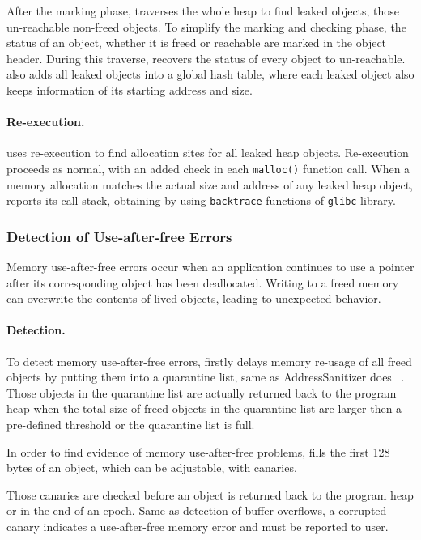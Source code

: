 After the marking phase, \doubletake{} traverses the whole heap to find leaked objects, those un-reachable non-freed objects. To simplify the marking and checking phase, the status of an object, whether it is freed or reachable are marked in the object header. During this traverse, \doubletake{} recovers the status of every object to un-reachable. \doubletake{} also adds all leaked objects into a global hash table, where each leaked object also keeps information of its starting address and size. 

\paragraph{Re-execution.}
\label{sec:leakreport}
\doubletake{} uses re-execution to find allocation sites for all leaked heap objects. Re-execution proceeds as normal, with an added check in each \texttt{malloc()} function call. When a memory allocation matches the actual size and address of any leaked heap object, 
\doubletake{} reports its call stack, obtaining by using \texttt{backtrace} 
functions of \texttt{glibc} library. 

\subsubsection{Detection of Use-after-free Errors}
\label{sec:danglingpointer}
Memory use-after-free errors occur when an application continues to use a pointer after its corresponding object has been deallocated.
Writing to a freed memory can overwrite the contents of lived objects, leading to unexpected behavior.  

\paragraph{Detection.}
To detect memory use-after-free errors, 
\doubletake{} firstly delays memory re-usage of all freed objects 
by putting them into a quarantine list, same as AddressSanitizer does ~\cite{AddressSanitizer}. 
Those objects in the quarantine list are actually returned back
to the program heap when the total size of freed objects in the quarantine list are larger then a pre-defined threshold or the quarantine list is full.

In order to find evidence of memory use-after-free problems, 
\doubletake{} fills the first 128 bytes of an object, which can be adjustable, with canaries. 

Those canaries are checked before an object is returned back to the program heap or in the end of an epoch. Same as detection of buffer overflows, 
a corrupted canary indicates a use-after-free memory error and must be reported to user. 

